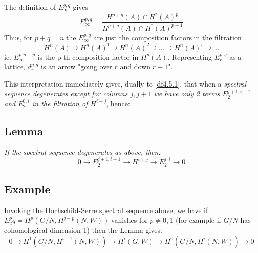 The definition of $E_\infty^{p,q}$ gives
$$E_\infty^{p,q} = \frac{H^{p+q}(A)\cap H^*(A)^p}{H^{p+q}(A)\cap
H^*(A)^{p+1}}$$ Thus, for $p+q = n$ the $E_\infty^{p,q}$ are just
the composition factors in the filtration
$$H^n(A)\supseteq H^n(A)^1\supseteq H^n(A)^2\supseteq \dots
\supseteq H^n(A)^v\supseteq \dots$$ ie. $E_\infty^{p,n-p}$ is the
p-th composition factor in $H^n(A)$. Representing $E_r^{p,q}$ as a
lattice, $d_r^{p,q}$ is an arrow "going over $r$ and down $r-1$".

This interpretation immediately gives, dually to \ref{df4.5.1},
that when a \emph{spectral sequence degenerates except for columns
$j,j+1$ we have only 2 terms $E_2^{j+1,i-1}$ and $E_2^{0,i}$ in
the filtration of $H^{i+j}$}, hence:

\subsection*{Lemma}
\emph{If the spectral sequence degenerates as above, then:
$$0\rightarrow E_2^{j+1,i-1}\rightarrow H^{i+j}\rightarrow
E_2^{j,i}\rightarrow 0$$}
\subsection*{Example}
Invoking the Hochschild-Serre spectral sequence above, we have
if\\
$E_2^pq = H^p(G/N,H^{q-p}(N,W))$ vanishes for $p\neq 0,1$ (for
example if $G/N$ has cohomological dimension 1) then the Lemma
gives:
$$0\rightarrow H^1(G/N,H^{i-1}(N,W))\rightarrow
H^i(G,W)\rightarrow H^0(G/N,H^i(N,W))\rightarrow 0$$










